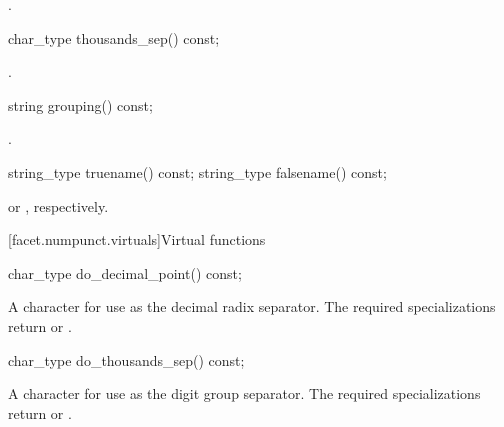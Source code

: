 \begin{itemdescr}
\pnum
\returns
{}.
\end{itemdescr}

%
\begin{itemdecl}
char_type thousands_sep() const;
\end{itemdecl}

\begin{itemdescr}
\pnum
\returns
{}.
\end{itemdescr}

%
\begin{itemdecl}
string grouping()  const;
\end{itemdecl}

\begin{itemdescr}
\pnum
\returns
{}.
\end{itemdescr}

%
%
\begin{itemdecl}
string_type truename()  const;
string_type falsename() const;
\end{itemdecl}

\begin{itemdescr}
\pnum
\returns
{}
or
,
respectively.
\end{itemdescr}

[facet.numpunct.virtuals]{Virtual functions}

%
\begin{itemdecl}
char_type do_decimal_point() const;
\end{itemdecl}

\begin{itemdescr}
\pnum
\returns
A character for use as the decimal radix separator.
The required specializations return  or .
\end{itemdescr}

%
\begin{itemdecl}
char_type do_thousands_sep() const;
\end{itemdecl}

\begin{itemdescr}
\pnum
\returns
A character for use as the digit group separator.
The required specializations return  or .
\end{itemdescr}

